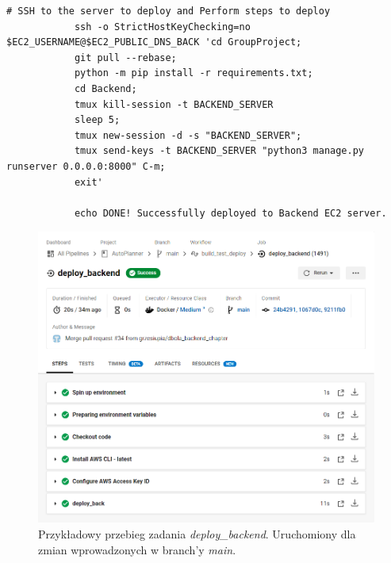\begin{itemize}
\begin{lstlisting}[caption=Część skryptu config.yml odpowiadająca za wykonanie zadania \textit{deploy\_backend}.]
            # SSH to the server to deploy and Perform steps to deploy
            ssh -o StrictHostKeyChecking=no $EC2_USERNAME@$EC2_PUBLIC_DNS_BACK 'cd GroupProject; 
            git pull --rebase;
            python -m pip install -r requirements.txt;
            cd Backend;
            tmux kill-session -t BACKEND_SERVER
            sleep 5;
            tmux new-session -d -s "BACKEND_SERVER";
            tmux send-keys -t BACKEND_SERVER "python3 manage.py runserver 0.0.0.0:8000" C-m;
            exit'

            echo DONE! Successfully deployed to Backend EC2 server.    
\end{lstlisting}
\newpage
\begin{figure}[H]
\centering\includegraphics[width=\textwidth]{figures/circleci_deploy_back}
\caption{Przykładowy przebieg zadania \textit{deploy\_backend}. Uruchomiony dla zmian wprowadzonych w branch'y \textit{main}.}
\end{figure}
\end{itemize}
	 